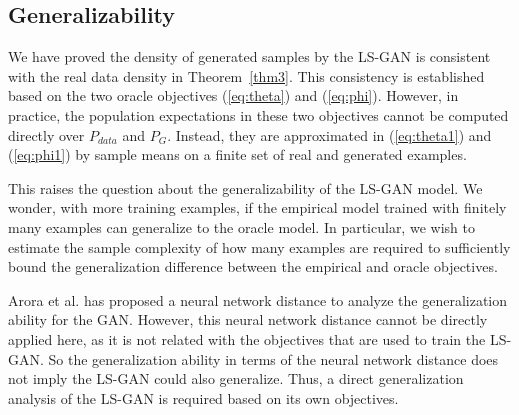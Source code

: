 
\subsection{Generalizability}\label{sec:gen}

We have proved the density of generated samples by the LS-GAN is consistent with the real data density in Theorem~\ref{thm3}. This consistency is established based on the two oracle objectives (\ref{eq:theta}) and (\ref{eq:phi}).  However, in practice, the population expectations in these two objectives cannot be computed directly over $P_{data}$ and $P_G$. Instead, they are approximated in (\ref{eq:theta1}) and (\ref{eq:phi1}) by sample means on a finite set of real and generated examples.

This raises the question about the generalizability of the LS-GAN model.  We wonder, with more training examples, if the empirical model trained with finitely many examples can generalize to the oracle model. In particular, we wish to estimate the sample complexity of how many examples are required to sufficiently bound the generalization difference between the empirical and oracle objectives.


Arora et al. \cite{arora2017generalization} has proposed a neural network distance to analyze the generalization ability for the GAN. However, this neural network distance cannot be directly applied here, as it is not related with the objectives that are used to train the LS-GAN. So the generalization ability in terms of the neural network distance does not imply the LS-GAN could also generalize. Thus, a direct generalization analysis of the LS-GAN is required based on its own objectives.

